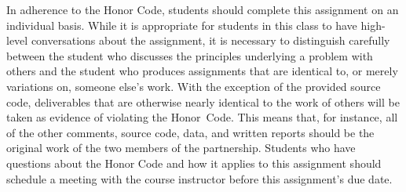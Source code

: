 In adherence to the Honor Code, students should complete this assignment on an individual basis. While it is appropriate
for students in this class to have high-level conversations about the assignment, it is necessary to distinguish
carefully between the student who discusses the principles underlying a problem with others and the student who produces
assignments that are identical to, or merely variations on, someone else's work.  With the exception of the provided
source code, deliverables that are otherwise nearly identical to the work of others will be taken as evidence of
violating the \mbox{Honor Code}. This means that, for instance, all of the other comments, source code, data, and
written reports should be the original work of the two members of the partnership. Students who have questions about the
Honor Code and how it applies to this assignment should schedule a meeting with the course instructor before this
assignment's due date.


